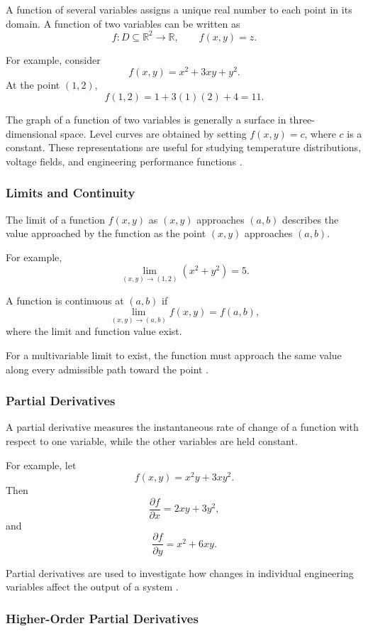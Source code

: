 \documentclass[a4paper,12pt]{article}
\theoremstyle{mystyle}
\numberwithin{equation}{section}
\numberwithin{theorem}{section}
\numberwithin{proposition}{section}
\numberwithin{example}{section}
\numberwithin{remark}{section}
\numberwithin{lemma}{section}
\numberwithin{corollary}{section}
\numberwithin{definition}{section}
\begin{document}
A function of several variables assigns a unique real
number to each point in its domain. A function of two
variables can be written as
\[
f:D\subseteq\mathbb{R}^2\longrightarrow\mathbb{R},
\qquad f(x,y)=z.
\]

For example, consider
\[
f(x,y)=x^2+3xy+y^2.
\]
At the point $(1,2)$,
\[
f(1,2)=1+3(1)(2)+4=11.
\]

The graph of a function of two variables is generally
a surface in three-dimensional space. Level curves
are obtained by setting $f(x,y)=c$, where $c$ is
a constant. These representations are useful for
studying temperature distributions, voltage fields,
and engineering performance functions
\cite{openstax2022}.

\subsubsection{Limits and Continuity}

The limit of a function $f(x,y)$ as $(x,y)$ approaches
$(a,b)$ describes the value approached by the function
as the point $(x,y)$ approaches $(a,b)$.

For example,
\[
\lim_{(x,y)\to(1,2)}(x^2+y^2)=5.
\]

A function is continuous at $(a,b)$ if
\[
\lim_{(x,y)\to(a,b)}f(x,y)=f(a,b),
\]
where the limit and function value exist.

For a multivariable limit to exist, the function must
approach the same value along every admissible path
toward the point \cite{openstaxlimits}.

\subsubsection{Partial Derivatives}

A partial derivative measures the instantaneous rate
of change of a function with respect to one variable,
while the other variables are held constant.

For example, let
\[
f(x,y)=x^2y+3xy^2.
\]
Then
\[
\frac{\partial f}{\partial x}=2xy+3y^2,
\]
and
\[
\frac{\partial f}{\partial y}=x^2+6xy.
\]

Partial derivatives are used to investigate how
changes in individual engineering variables affect
the output of a system \cite{openstaxpartials}.

\subsubsection{Higher-Order Partial Derivatives}
\end{document}
